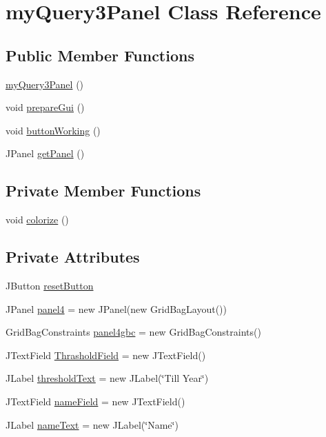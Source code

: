 \hypertarget{classmy_query3_panel}{}\section{my\+Query3\+Panel Class Reference}
\label{classmy_query3_panel}
\subsection*{Public Member Functions}
\begin{DoxyCompactItemize}
\item 
\hyperlink{classmy_query3_panel_a41792f89e40b96e00d365f08c64ede34}{my\+Query3\+Panel} ()
\item 
void \hyperlink{classmy_query3_panel_a0ba85999b328528fb1255d54f9e35adf}{prepare\+Gui} ()
\item 
void \hyperlink{classmy_query3_panel_a733fe7c07a4083484bde4cf976ef62dc}{button\+Working} ()
\item 
J\+Panel \hyperlink{classmy_query3_panel_a7e32c709687bc0e276dbfb4abc101c83}{get\+Panel} ()
\end{DoxyCompactItemize}
\subsection*{Private Member Functions}
\begin{DoxyCompactItemize}
\item 
void \hyperlink{classmy_query3_panel_a81388a516e95727e7d69abd71cae43fa}{colorize} ()
\end{DoxyCompactItemize}
\subsection*{Private Attributes}
\begin{DoxyCompactItemize}
\item 
J\+Button \hyperlink{classmy_query3_panel_ac392a21f5bf8b94abc2277cd7f195714}{reset\+Button}
\item 
J\+Panel \hyperlink{classmy_query3_panel_a2ac952531b06b879f00a70bac72d21fc}{panel4} = new J\+Panel(new Grid\+Bag\+Layout())
\item 
Grid\+Bag\+Constraints \hyperlink{classmy_query3_panel_ad2ccf349d9e4a1c851e4a33f03d5be23}{panel4gbc} = new Grid\+Bag\+Constraints()
\item 
J\+Text\+Field \hyperlink{classmy_query3_panel_aa69c674ee3284608d2df2c813c8a0ae0}{Thrashold\+Field} = new J\+Text\+Field()
\item 
J\+Label \hyperlink{classmy_query3_panel_a1faf4fe8c937b0ad364addc3908b094f}{threshold\+Text} = new J\+Label(\char`\"{}Till Year\char`\"{})
\item 
J\+Text\+Field \hyperlink{classmy_query3_panel_a35151bea612812b2db64eefe6afb8a6a}{name\+Field} = new J\+Text\+Field()
\item 
J\+Label \hyperlink{classmy_query3_panel_a207acd41522a838e3d706c627e17a84d}{name\+Text} = new J\+Label(\char`\"{}Name\char`\"{})
\end{DoxyCompactItemize}


